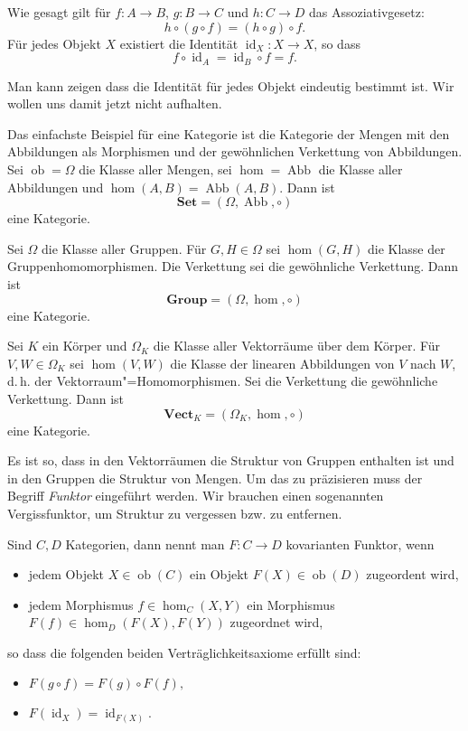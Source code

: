 \documentclass{beamer}
\newcommand{\id}{\operatorname{id}}
\newcommand{\Abb}{\operatorname{Abb}}
\newcommand{\ob}{\operatorname{ob}}
\begin{document}
\begin{frame}
Wie gesagt gilt für $f\colon A\to B$, $g\colon B\to C$ und
$h\colon C\to D$ das Assoziativgesetz:
\[h\circ (g\circ f) = (h\circ g)\circ f.\]
Für jedes Objekt $X$ existiert die Identität $\id_X\colon X\to X$, so
dass
\[f\circ\id_A = \id_B\circ f = f.\]
\end{frame}

\begin{frame}
Man kann zeigen dass die Identität für jedes Objekt eindeutig
bestimmt ist. Wir wollen uns damit jetzt nicht aufhalten.
\end{frame}

\begin{frame}
Das einfachste Beispiel für eine Kategorie ist die Kategorie der
Mengen mit den Abbildungen als Morphismen und der gewöhnlichen
Verkettung von Abbildungen.
Sei $\ob=\Omega$ die Klasse aller Mengen, sei $\hom=\Abb$ die Klasse
aller Abbildungen und $\hom(A,B)=\Abb(A,B)$. Dann ist
\[\mathbf{Set} = (\Omega,\Abb,\circ)\]
eine Kategorie.
\end{frame}

\begin{frame}
Sei $\Omega$ die Klasse aller Gruppen. Für $G,H\in\Omega$ sei $\hom(G,H)$
die Klasse der Gruppenhomomorphismen. Die Verkettung sei die
gewöhnliche Verkettung. Dann ist
\[\mathbf{Group} = (\Omega,\hom,\circ)\]
eine Kategorie.
\end{frame}

\begin{frame}
Sei $K$ ein Körper und $\Omega_K$ die Klasse aller Vektorräume
über dem Körper. Für $V,W\in\Omega_K$ sei $\hom(V,W)$ die Klasse
der linearen Abbildungen von $V$ nach $W$, d.\,h. der
Vektorraum"=Homomorphismen. Sei die Verkettung die gewöhnliche
Verkettung. Dann ist
\[\mathbf{Vect}_K = (\Omega_K,\hom,\circ)\]
eine Kategorie.
\end{frame}

\begin{frame}
Es ist so, dass in den Vektorräumen die Struktur von Gruppen
enthalten ist und in den Gruppen die Struktur von Mengen. Um das
zu präzisieren muss der Begriff \emph{Funktor} eingeführt werden. Wir
brauchen einen sogenannten Vergissfunktor, um Struktur zu vergessen
bzw. zu entfernen.
\end{frame}

\begin{frame}
Sind $C,D$ Kategorien, dann nennt man $F\colon C\to D$ kovarianten
Funktor, wenn
\begin{itemize}
\item jedem Objekt $X\in\ob(C)$ ein Objekt $F(X)\in\ob(D)$ zugeordent wird,
\item jedem Morphismus $f\in\hom_C(X,Y)$ ein Morphismus $F(f)\in\hom_D(F(X),F(Y))$
  zugeordnet wird,
\end{itemize}
so dass die folgenden beiden Verträglichkeitsaxiome erfüllt sind:
\begin{itemize}
\item $F(g\circ f) = F(g)\circ F(f),$
\item $F(\id_X) = \id_{F(X)}.$
\end{itemize}
\end{frame}
\end{document}
